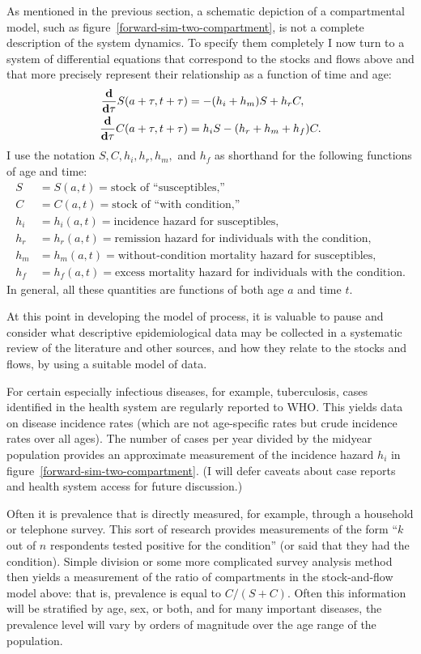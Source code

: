 As mentioned in the previous section, a schematic depiction of a
compartmental model, such as figure~\ref{forward-sim-two-compartment},
is not a complete description of the system dynamics.  To specify them
completely I now turn to a system of differential equations
that correspond to the stocks and flows above and that more precisely
represent their relationship as a function of time and age:
\begin{align*}
\frac{\mathbf{d} }{\mathbf{d} \tau} S(a+\tau,t+\tau) &= -(h_i + h_m)S + h_rC,\\
\frac{\mathbf{d}}{\mathbf{d} \tau} C(a+\tau,t+\tau) &= h_iS - (h_r + h_m + h_f)C.\\
\end{align*}
I use the notation $S,C,h_i,h_r,h_m,$ and $h_f$ as shorthand for the
following functions of age and time:
\begin{align*}
S &= S(a,t) = \text{stock of ``susceptibles,''}\\
C &= C(a,t) = \text{stock of ``with condition,''}\\[.1in]
h_i &= h_i(a,t) = \text{incidence hazard for susceptibles},\\
h_r &= h_r(a,t) = \text{remission hazard for individuals with the condition},\\
h_m &= h_m(a,t) = \text{without-condition mortality hazard for susceptibles},\\
h_f &= h_f(a,t) = \text{excess mortality hazard for individuals with the
condition}.
\end{align*}
In general, all these quantities are functions of both age $a$ and
time $t$.

At this point in developing the model of process, it is valuable to
pause and consider what descriptive epidemiological data may be
collected in a systematic review of the literature and other sources,
and how they relate to the stocks and flows,
by using a suitable model of data.

For certain especially infectious diseases, for example, tuberculosis, cases identified in the
health system are regularly reported to WHO.
This yields data on disease
incidence rates (which are not age-specific rates but crude incidence rates
over all ages).  The number of cases per
year divided by the midyear population provides an approximate
measurement of the incidence hazard $h_i$ in figure~\ref{forward-sim-two-compartment}.
(I will defer caveats about case reports and health system
access for future discussion.)

Often it is prevalence that is directly measured, for example, through
a household or telephone survey.  This sort of research provides
measurements of the form ``$k$ out of $n$ respondents tested positive
for the condition'' (or said that they had the condition). Simple
division or some more complicated survey analysis method then yields a
measurement of the ratio of compartments in the stock-and-flow model
above: that is, prevalence is equal to $C/(S+C)$.  Often this
information will be stratified by age, sex, or both, and for many
important diseases, the prevalence level will vary by orders of
magnitude over the age range of the population.

